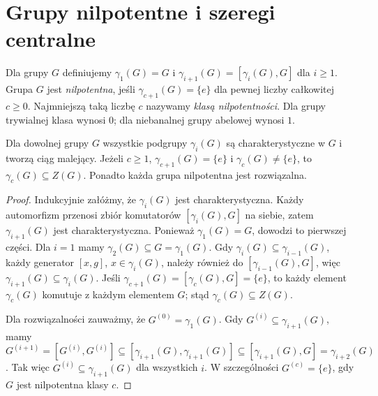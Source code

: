 \section{Grupy nilpotentne i szeregi centralne}
\begin{definicja}
\label{aa:def:dolny-centralny}
Dla grupy $G$ definiujemy
$\gamma_1(G)=G$ i $\gamma_{i+1}(G)=[\gamma_i(G),G]$ dla $i\ge1$.
Grupa $G$ jest \emph{nilpotentna}, jeśli $\gamma_{c+1}(G)=\{e\}$
dla pewnej liczby całkowitej $c\ge0$.
Najmniejszą taką liczbę $c$ nazywamy \emph{klasą nilpotentności}.
Dla grupy trywialnej klasa wynosi $0$; dla niebanalnej grupy
abelowej wynosi $1$.
\end{definicja}
\begin{lemat}
\label{aa:lem:lower-properties}
Dla dowolnej grupy $G$ wszystkie podgrupy $\gamma_i(G)$
są charakterystyczne w $G$ i tworzą ciąg malejący.
Jeżeli $c\ge1$, $\gamma_{c+1}(G)=\{e\}$ i
$\gamma_c(G)\ne\{e\}$, to $\gamma_c(G)\subseteq Z(G)$.
Ponadto każda grupa nilpotentna jest rozwiązalna.
\end{lemat}
\begin{proof}
Indukcyjnie załóżmy, że $\gamma_i(G)$ jest charakterystyczna.
Każdy automorfizm przenosi zbiór komutatorów
$[\gamma_i(G),G]$ na siebie, zatem
$\gamma_{i+1}(G)$ jest charakterystyczna.
Ponieważ $\gamma_1(G)=G$, dowodzi to pierwszej części.
Dla $i=1$ mamy $\gamma_2(G)\subseteq G=\gamma_1(G)$.
Gdy $\gamma_i(G)\subseteq\gamma_{i-1}(G)$,
każdy generator $[x,g]$, $x\in\gamma_i(G)$, należy również
 do $[\gamma_{i-1}(G),G]$, więc
$\gamma_{i+1}(G)\subseteq\gamma_i(G)$.
Jeśli $\gamma_{c+1}(G)=[\gamma_c(G),G]=\{e\}$,
to każdy element $\gamma_c(G)$ komutuje z każdym elementem $G$;
stąd $\gamma_c(G)\subseteq Z(G)$.

Dla rozwiązalności zauważmy, że $G^{(0)}=\gamma_1(G)$.
Gdy $G^{(i)}\subseteq\gamma_{i+1}(G)$, mamy
$G^{(i+1)}=[G^{(i)},G^{(i)}]
\subseteq[\gamma_{i+1}(G),\gamma_{i+1}(G)]
\subseteq[\gamma_{i+1}(G),G]=\gamma_{i+2}(G)$.
Tak więc $G^{(i)}\subseteq\gamma_{i+1}(G)$ dla wszystkich $i$.
W szczególności $G^{(c)}=\{e\}$, gdy $G$ jest nilpotentna
klasy $c$.
\end{proof}

